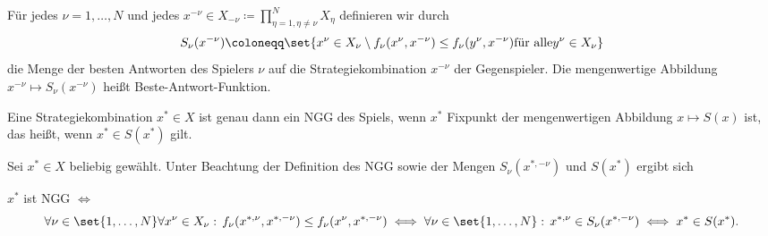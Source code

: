 \begin{definition}
  Für jedes $\nu = 1, \dots, N$ und jedes $x^{-\nu} \in X_{-\nu}\coloneqq \prod_{\eta = 1, \eta \neq \nu}^{N} X_{\eta}$ definieren wir durch
  \begin{align*}
    S_{\nu}(x^{-\nu}) \coloneqq \set{x^{\nu}\in X_{\nu}\setminus f_{\nu}(x^{\nu}, x^{-\nu}) \leq f_{\nu}(y^{\nu}, x^{-\nu}) \text{für alle} y^{\nu} \in X_{\nu}} 
  \end{align*}
die Menge der besten Antworten des Spielers $\nu$ auf die Strategiekombination $x^{-\nu}$ der Gegenspieler. Die mengenwertige Abbildung $x^{-\nu}\mapsto S_{\nu}(x^{-\nu})$ heißt Beste-Antwort-Funktion.
\end{definition}
\begin{satz}
  Eine Strategiekombination $x^{*} \in X$ ist genau dann ein NGG des Spiels, wenn $x^{*}$ Fixpunkt der mengenwertigen Abbildung $x \mapsto S(x)$ ist, das heißt, wenn $x^{*} \in S(x^{*})$ gilt. 
\end{satz}
  \begin{beweis}
Sei $x^{*} \in X$ beliebig gewählt. Unter Beachtung der Definition des NGG sowie der Mengen $S_{\nu}(x^{*, - \nu})$ und $S(x^{*})$ ergibt sich 

$x^{*}$ ist NGG $\iff$
\begin{align*}
  \forall \nu \in \set{1, \dots, N} \forall x^{\nu}\in X_{\nu}: \, f_{\nu}(x^{*, \nu}, x^{*, -\nu})\leq f_{\nu}(x^{\nu}, x^{*, -\nu}) \iff \forall \nu \in \set{1, \dots, N}: \, x^{*, \nu}\in S_{\nu}(x^{*, -\nu}) \iff x^{*} \in S(x^{*}).
\end{align*}
\end{beweis}

